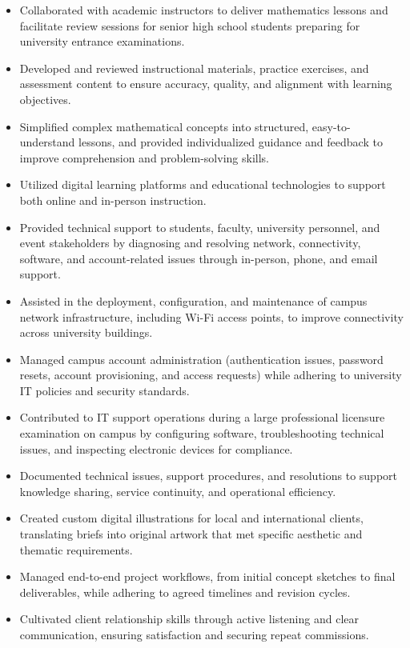 \documentclass[10pt,a4paper]{article}
\begin{document}
\begin{itemize}
    \item Collaborated with academic instructors to deliver mathematics lessons and facilitate review sessions for senior high school students preparing for university entrance examinations.
    \item Developed and reviewed instructional materials, practice exercises, and assessment content to ensure accuracy, quality, and alignment with learning objectives.
    \item Simplified complex mathematical concepts into structured, easy-to-understand lessons, and provided individualized guidance and feedback to improve comprehension and problem-solving skills.
    \item Utilized digital learning platforms and educational technologies to support both online and in-person instruction.
\end{itemize}

\begin{itemize}
    \item Provided technical support to students, faculty, university personnel, and event stakeholders by diagnosing and resolving network, connectivity, software, and account-related issues through in-person, phone, and email support.
    \item Assisted in the deployment, configuration, and maintenance of campus network infrastructure, including Wi-Fi access points, to improve connectivity across university buildings.
    \item Managed campus account administration (authentication issues, password resets, account provisioning, and access requests) while adhering to university IT policies and security standards.
    \item Contributed to IT support operations during a large professional licensure examination on campus by configuring software, troubleshooting technical issues, and inspecting electronic devices for compliance.
    \item Documented technical issues, support procedures, and resolutions to support knowledge sharing, service continuity, and operational efficiency.
\end{itemize}

\begin{itemize}
    \item Created custom digital illustrations for local and international clients, translating briefs into original artwork that met specific aesthetic and thematic requirements.
    \item Managed end-to-end project workflows, from initial concept sketches to final deliverables, while adhering to agreed timelines and revision cycles.
    \item Cultivated client relationship skills through active listening and clear communication, ensuring satisfaction and securing repeat commissions.
\end{itemize}
\end{document}
